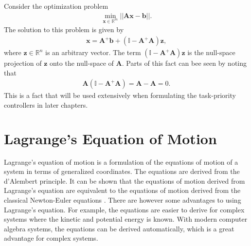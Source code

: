 Consider the optimization problem
\begin{align}
    \min_{\bm{x} \in \mathbb{R}^m} || \bm{A} \bm{x} - \bm{b} ||.
\end{align}
The solution to this problem is given by
\begin{align}
    \bm{x} = \bm{A}^{+} \bm{b} + (\mathbb{I} - \bm{A}^{+} \bm{A}) \bm{z},
\end{align}
where $\bm{z} \in \mathbb{R}^n$ is an arbitrary vector. The term $(\mathbb{I} - \bm{A}^{+} \bm{A}) \bm{z}$
is the null-space projection of $\bm{z}$ onto the null-space of $\bm{A}$. Parts
of this fact can bee seen by noting that
\begin{align}
    \bm{A}\left(\mathbb{I} - \bm{A}^{+} \bm{A}\right) = \bm{A} - \bm{A} = 0.
\end{align}
This is a fact that will be used extensively when formulating the task-priority
controllers in later chapters.

\section{Lagrange's Equation of Motion}
\label{sec:lagrange}
Lagrange's equation of motion is a formulation of the equations of motion of a
system in terms of generalized coordinates. The equations are derived from the
d'Alembert principle. It can be shown that the equations of motion derived from
Lagrange's equation are equivalent to the equations of motion derived from
the classical Newton-Euler equations \cite{modsim}. There are however some advantages to using
Lagrange's equation. For example, the equations are easier to derive for complex
systems where the kinetic and potential energy is known. With modern computer
algebra systems, the equations can be derived automatically, which is
a great advantage for complex systems.

